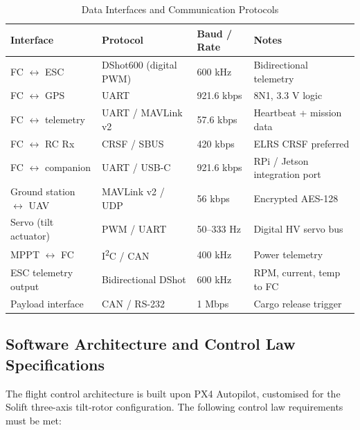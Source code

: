 \begin{table}[H]
\centering
\small
\caption{Data Interfaces and Communication Protocols}
\begin{tabularx}{\textwidth}{L{4cm} C{2.5cm} C{2cm} X}
\toprule
\textbf{Interface} &
\textbf{Protocol} &
\textbf{Baud / Rate} &
\textbf{Notes} \\
\midrule
FC $\leftrightarrow$ ESC     & DShot600 (digital PWM) & 600 kHz  & Bidirectional telemetry \\
FC $\leftrightarrow$ GPS     & UART                   & 921.6 kbps & 8N1, 3.3 V logic \\
FC $\leftrightarrow$ telemetry & UART / MAVLink v2    & 57.6 kbps  & Heartbeat + mission data \\
FC $\leftrightarrow$ RC Rx   & CRSF / SBUS            & 420 kbps   & ELRS CRSF preferred \\
FC $\leftrightarrow$ companion & UART / USB-C         & 921.6 kbps & RPi / Jetson integration port \\
Ground station $\leftrightarrow$ UAV & MAVLink v2 / UDP & 56 kbps & Encrypted AES-128 \\
Servo (tilt actuator) & PWM / UART              & 50--333 Hz   & Digital HV servo bus \\
MPPT $\leftrightarrow$ FC    & I\textsuperscript{2}C / CAN & 400 kHz & Power telemetry \\
ESC telemetry output  & Bidirectional DShot     & 600 kHz      & RPM, current, temp to FC \\
Payload interface     & CAN / RS-232            & 1 Mbps       & Cargo release trigger \\
\bottomrule
\end{tabularx}
\end{table}

\subsection{Software Architecture and Control Law Specifications}

The flight control architecture is built upon PX4 Autopilot, customised for the Solift three-axis tilt-rotor configuration. The following control law requirements must be met:

